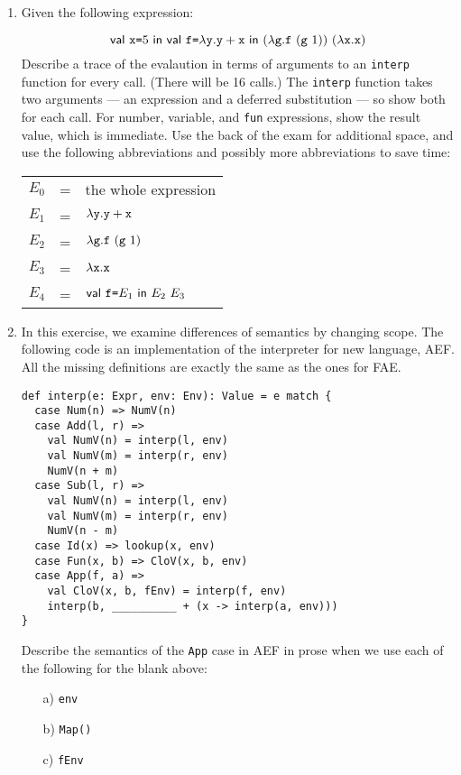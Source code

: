 \begin{enumerate}
\item Given the following expression:

\[
\ebind{\cx}{5}{
    \ebind{\code{f}}{\efun{\cy}{\eadd{\cy}{\cx}}}{
        \eapp{(\efun{\code{g}}{\eapp{\code{f}}{(\eapp{\code{g}}{1})}})}
        {(\efun{\cx}{\cx})}
    }
}
\]
Describe a trace of the evalaution in terms of arguments to an \texttt{interp}
function for every call. (There will be 16 calls.) The \texttt{interp} function
takes two arguments --- an expression and a
   deferred substitution --- so show both for each call.  For number,
   variable, and \texttt{fun} expressions, show the result value, which
   is immediate. Use the back of the exam for additional space, and
   use the following abbreviations and possibly more abbreviations
 to save time:

\begin{center}
\begin{tabular}{lcl}
$E_0$ & = & the whole expression \\
$E_1$ & = & $\lambda\texttt{y}.\texttt{y}+\texttt{x}$ \\
$E_2$ & = & $\lambda\texttt{g}.\texttt{f}\ (\texttt{g}\ 1)$ \\
$E_3$ & = & $\lambda\texttt{x}.\texttt{x}$ \\
$E_4$ & = & $\textsf{val}\ \texttt{f}\texttt{=} E_1\ \textsf{in}\ E_2\ E_3$
\end{tabular}
\end{center}

\item In this exercise, we examine differences of semantics by changing scope.
The following code is an implementation of the interpreter for new language, AEF.
All the missing definitions are exactly the same as the ones for FAE.

\begin{verbatim}
def interp(e: Expr, env: Env): Value = e match {
  case Num(n) => NumV(n)
  case Add(l, r) =>
    val NumV(n) = interp(l, env)
    val NumV(m) = interp(r, env)
    NumV(n + m)
  case Sub(l, r) =>
    val NumV(n) = interp(l, env)
    val NumV(m) = interp(r, env)
    NumV(n - m)
  case Id(x) => lookup(x, env)
  case Fun(x, b) => CloV(x, b, env)
  case App(f, a) =>
    val CloV(x, b, fEnv) = interp(f, env)
    interp(b, __________ + (x -> interp(a, env)))
}
\end{verbatim}

Describe the semantics of the \texttt{App} case in AEF in prose
when we use each of the following for the blank above:
\begin{itemize}
  \item[a)] \texttt{env}
  \item[b)] \texttt{Map()}
  \item[c)] \texttt{fEnv}
\end{itemize}


\end{enumerate}
